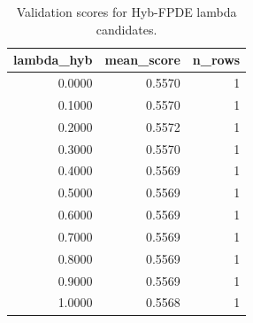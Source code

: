 \begin{table}[t]
\caption{Validation scores for Hyb-FPDE lambda candidates.}
\label{tab:lambda_distribution_computed}
\centering
\begin{tabular}{rrr}
\toprule
lambda\_hyb & mean\_score & n\_rows \\
\midrule
0.0000 & 0.5570 & 1 \\
0.1000 & 0.5570 & 1 \\
0.2000 & 0.5572 & 1 \\
0.3000 & 0.5570 & 1 \\
0.4000 & 0.5569 & 1 \\
0.5000 & 0.5569 & 1 \\
0.6000 & 0.5569 & 1 \\
0.7000 & 0.5569 & 1 \\
0.8000 & 0.5569 & 1 \\
0.9000 & 0.5569 & 1 \\
1.0000 & 0.5568 & 1 \\
\bottomrule
\end{tabular}

\end{table}
